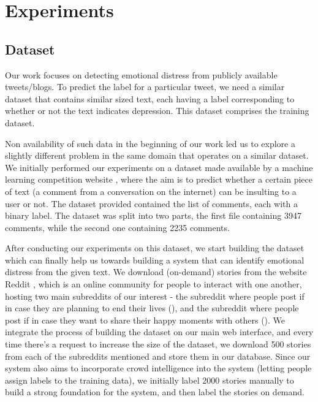 \chapter{Experiments}
\label{chapter:Experiments}


\section{Dataset}
Our work focuses on detecting emotional distress from publicly available tweets/blogs. To predict the label for a particular tweet, we need a similar dataset that contains similar sized text, each having a label corresponding to whether or not the text indicates depression. This dataset comprises the training dataset.

Non availability of such data in the beginning of our work led us to explore a slightly different problem in the same domain that operates on a similar dataset. We initially performed our experiments on a dataset made available by a machine learning competition website \cite{kaggle}, where the aim is to predict whether a certain piece of text (a comment from a conversation on the internet) can be insulting to a user or not. The dataset provided contained the list of comments, each with a binary label. The dataset was split into two parts, the first file containing 3947 comments, while the second one containing 2235 comments.

After conducting our experiments on this dataset, we start building the dataset which can finally help us towards building a system that can identify emotional distress from the given text. We download (on-demand) stories from the website Reddit \cite{reddit}, which is an online community for people to interact with one another, hosting two main subreddits of our interest - the subreddit where people post if in case they are planning to end their lives (\cite{reddit_suicidewatch}), and the subreddit where people post if in case they want to share their happy moments with others (\cite{reddit_happy}). We integrate the process of building the dataset on our main web interface, and every time there's a request to increase the size of the dataset, we download 500 stories from each of the subreddits mentioned and store them in our database. Since our system also aims to incorporate crowd intelligence into the system (letting people assign labels to the training data), we initially label 2000 stories manually to build a strong foundation for the system, and then label the stories on demand.

